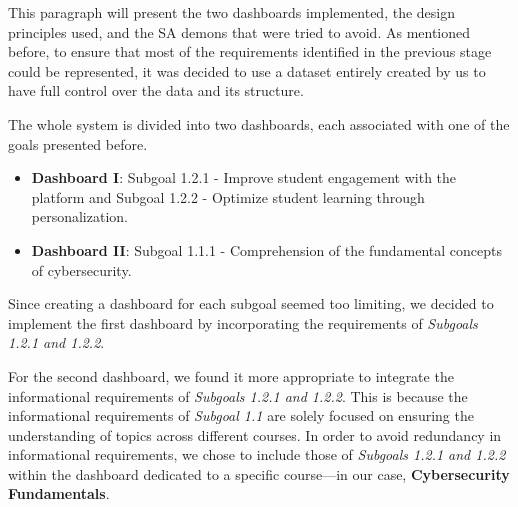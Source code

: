 This paragraph will present the two dashboards implemented, the design principles used, and the SA demons that were tried to avoid. As mentioned before, to ensure that most of the requirements identified in the previous stage could be represented, it was decided to use a dataset entirely created by us to have full control over the data and its structure.

The whole system is divided into two dashboards, each associated with one of the goals presented before.

\begin{itemize}
    \item \textbf{Dashboard I}: Subgoal 1.2.1 - Improve student engagement with the platform and Subgoal 1.2.2 - Optimize student learning through personalization.
    \item \textbf{Dashboard II}: Subgoal 1.1.1 - Comprehension of the fundamental concepts of cybersecurity.
\end{itemize}

Since creating a dashboard for each subgoal seemed too limiting, we decided to implement the first dashboard by incorporating the requirements of \textit{Subgoals 1.2.1 and 1.2.2}. 

For the second dashboard, we found it more appropriate to integrate the informational requirements of \textit{Subgoals 1.2.1 and 1.2.2}. This is because the informational requirements of \textit{Subgoal 1.1} are solely focused on ensuring the understanding of topics across different courses. In order to avoid redundancy in informational requirements, we chose to include those of \textit{Subgoals 1.2.1 and 1.2.2} within the dashboard dedicated to a specific course—in our case, \textbf{Cybersecurity Fundamentals}. 





